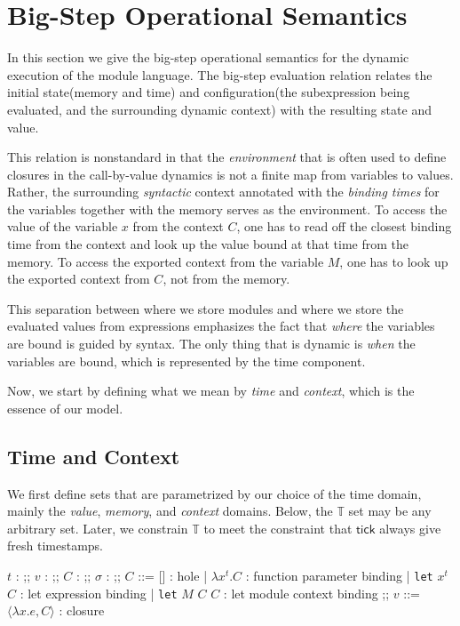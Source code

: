 \documentclass{article}
\newcommand*{\Time}{\mathbb{T}}
\newcommand*{\Ctx}[1]{\text{Ctx}\:{#1}}
\newcommand*{\Value}[1]{\text{Val}\:{#1}}
\newcommand*{\Mem}[1]{\text{Mem}\:{#1}}
\newcommand*{\fin}[2]{{#1}\xrightarrow{\text{fin}}{#2}}
\newcommand*{\tick}{\mathsf{tick}}
\begin{document}
\section{Big-Step Operational Semantics}

In this section we give the big-step operational semantics for the dynamic execution of the module language.
The big-step evaluation relation relates the initial state(memory and time) and configuration(the subexpression being evaluated, and the surrounding dynamic context) with the resulting state and value.

This relation is nonstandard in that the \emph{environment} that is often used to define closures in the call-by-value dynamics is not a finite map from variables to values.
Rather, the surrounding \emph{syntactic} context annotated with the \emph{binding times} for the variables together with the memory serves as the environment.
To access the value of the variable $x$ from the context $C$, one has to read off the closest binding time from the context and look up the value bound at that time from the memory.
To access the exported context from the variable $M$, one has to look up the exported context from $C$, not from the memory.

This separation between where we store modules and where we store the evaluated values from expressions emphasizes the fact that \emph{where} the variables are bound is guided by syntax.
The only thing that is dynamic is \emph{when} the variables are bound, which is represented by the time component.

Now, we start by defining what we mean by \emph{time} and \emph{context}, which is the essence of our model.

\subsection{Time and Context}

We first define sets that are parametrized by our choice of the time domain, mainly the \emph{value}, \emph{memory}, and \emph{context} domains.
Below, the $\Time$ set may be any arbitrary set.
Later, we constrain $\Time$ to meet the constraint that $\tick$ always give fresh timestamps.

\begin{bnfgrammar}
  $t$ : \in \Time
  ;;
  $v$ : \in \Value{\Time}
  ;;
  $C$ : \in \Ctx{\Time}
  ;;
  $\sigma$ : \in \Mem{\Time} \triangleq \fin{\Time}{\Value{\Time}}
  ;;
  $C$ ::= [] : hole
  | $\lambda x^{t}.C$ : function parameter binding
  | \texttt{let} $x^{t}$ $C$ : let expression binding
  | \texttt{let} $M$ $C$ $C$ : let module context binding
  ;;
  $v$ ::= $\langle \lambda x.e, C \rangle$ : closure
\end{bnfgrammar}
\end{document}
